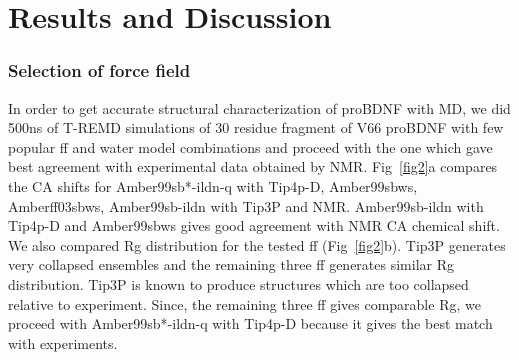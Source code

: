 \documentclass[10pt,letterpaper]{article}
\begin{document}
\section*{Results and Discussion}

\subsubsection*{Selection of force field}
In order to get accurate structural characterization of proBDNF with MD,  we did  500ns of T-REMD simulations of 30 residue fragment of V66 proBDNF with few popular ff and water model combinations and proceed with the one which gave best agreement with experimental data obtained by NMR. Fig~\ref{fig2}a compares the CA shifts for  Amber99sb*-ildn-q with Tip4p-D,  Amber99sbws, Amberff03sbws, Amber99sb-ildn with Tip3P and NMR.  Amber99sb-ildn with Tip4p-D and Amber99sbws gives good agreement with NMR CA chemical shift.  We also compared Rg distribution for the tested ff (Fig~\ref{fig2}b).  Tip3P generates very collapsed ensembles and the remaining three ff generates similar Rg distribution. Tip3P is known to produce structures which are too collapsed relative to experiment. Since, the remaining three ff gives comparable Rg, we proceed with Amber99sb*-ildn-q with Tip4p-D because it gives the best match with experiments. 
\end{document}

